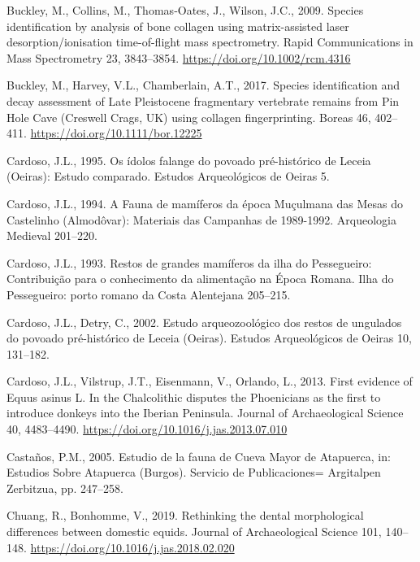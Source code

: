 \documentclass[preprint, 3p, authoryear]{elsarticle} %
\newlength{\cslhangindent}
\newlength{\cslentryspacingunit} %
\newenvironment{CSLReferences}[2] %
 {%
  \setlength{\parindent}{0pt}
  \ifodd #1
  \let\oldpar\par
  \def\par{\hangindent=\cslhangindent\oldpar}
  \fi
  \setlength{\parskip}{#2\cslentryspacingunit}
 }%
 {}
\begin{document}
\begin{CSLReferences}{1}{0}
\leavevmode{}%
Buckley, M., Collins, M., Thomas‐Oates, J., Wilson, J.C., 2009. Species identification by analysis of bone collagen using matrix-assisted laser desorption/ionisation time-of-flight mass spectrometry. Rapid Communications in Mass Spectrometry 23, 3843--3854. \url{https://doi.org/10.1002/rcm.4316}

\leavevmode{}%
Buckley, M., Harvey, V.L., Chamberlain, A.T., 2017. Species identification and decay assessment of {Late Pleistocene} fragmentary vertebrate remains from {Pin Hole Cave} ({Creswell Crags}, {UK}) using collagen fingerprinting. Boreas 46, 402--411. \url{https://doi.org/10.1111/bor.12225}

\leavevmode{}%
Cardoso, J.L., 1995. Os ídolos falange do povoado pré-histórico de {Leceia} ({Oeiras}): Estudo comparado. Estudos Arqueológicos de Oeiras 5.

\leavevmode{}%
Cardoso, J.L., 1994. A {Fauna} de mamíferos da época {Muçulmana} das {Mesas} do {Castelinho} ({Almodôvar}): {Materiais} das {Campanhas} de 1989-1992. Arqueologia Medieval 201--220.

\leavevmode{}%
Cardoso, J.L., 1993. Restos de grandes mamíferos da ilha do {Pessegueiro}: Contribuição para o conhecimento da alimentação na {Época Romana}. Ilha do Pessegueiro: porto romano da Costa Alentejana 205--215.

\leavevmode{}%
Cardoso, J.L., Detry, C., 2002. Estudo arqueozoológico dos restos de ungulados do povoado pré-histórico de {Leceia} ({Oeiras}). Estudos Arqueológicos de Oeiras 10, 131--182.

\leavevmode{}%
Cardoso, J.L., Vilstrup, J.T., Eisenmann, V., Orlando, L., 2013. First evidence of {Equus} asinus {L}. In the {Chalcolithic} disputes the {Phoenicians} as the first to introduce donkeys into the {Iberian Peninsula}. Journal of Archaeological Science 40, 4483--4490. \url{https://doi.org/10.1016/j.jas.2013.07.010}

\leavevmode{}%
Castaños, P.M., 2005. Estudio de la fauna de {Cueva Mayor} de {Atapuerca}, in: Estudios Sobre {Atapuerca} ({Burgos}). {Servicio de Publicaciones= Argitalpen Zerbitzua}, pp. 247--258.

\leavevmode{}%
Chuang, R., Bonhomme, V., 2019. Rethinking the dental morphological differences between domestic equids. Journal of Archaeological Science 101, 140--148. \url{https://doi.org/10.1016/j.jas.2018.02.020}


\end{CSLReferences}
\end{document}
